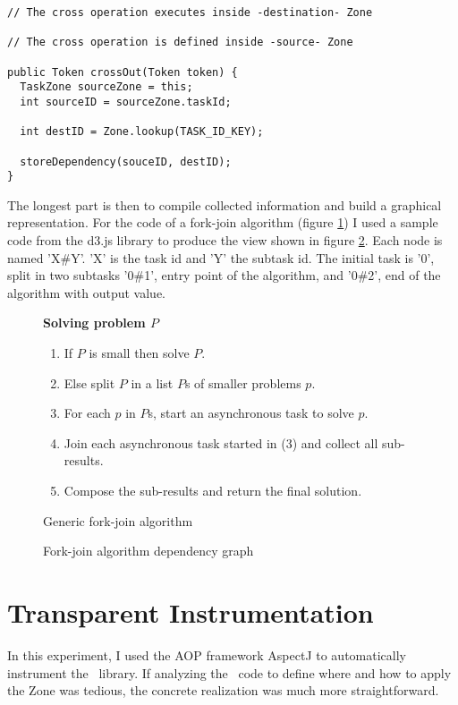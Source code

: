 \begin{lstlisting}
// The cross operation executes inside -destination- Zone

// The cross operation is defined inside -source- Zone

public Token crossOut(Token token) {
  TaskZone sourceZone = this;
  int sourceID = sourceZone.taskId;

  int destID = Zone.lookup(TASK_ID_KEY);

  storeDependency(souceID, destID);
}
\end{lstlisting}

The longest part is then to compile collected information and build a graphical representation. For the code of a fork-join algorithm (figure \ref{fig:fj-alg}) I used a sample code from the d3.js library to produce the view shown in figure \ref{fig:fjt-bundle}. Each node is named 'X\#Y'. 'X' is the task id and 'Y' the subtask id. The initial task is '0', split in two subtasks '0\#1', entry point of the algorithm, and '0\#2', end of the algorithm with output value.

\begin{figure}[h]
  \textbf{Solving problem $P$}
  \begin{enumerate}
  \item If $P$ is small then solve $P$.
  \item Else split $P$ in a list $P$s of smaller problems $p$.
  \item For each $p$ in $P$s, start an asynchronous task to solve $p$.
  \item Join each asynchronous task started in (3) and collect all sub-results.
  \item Compose the sub-results and return the final solution.
  \end{enumerate}
\caption{Generic fork-join algorithm}
\label{fig:fj-alg}
\end{figure}

\begin{figure}
  \centering
  \caption{Fork-join algorithm dependency graph}
  \label{fig:fjt-bundle}
\end{figure}


\section{Transparent Instrumentation}

In this experiment, I used the AOP framework AspectJ to automatically instrument the \vertx\ library. If analyzing the \vertx\ code to define where and how to apply the Zone was tedious, the concrete realization was much more straightforward.

